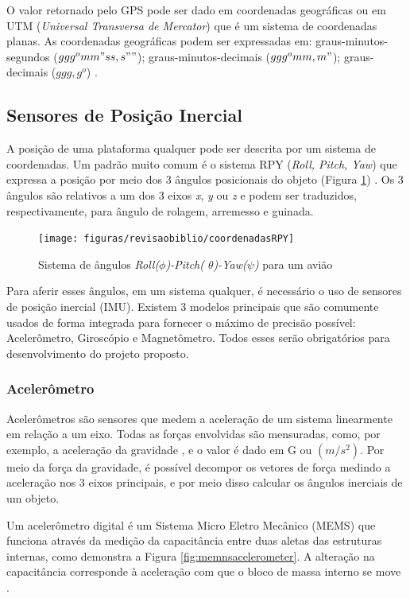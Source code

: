 O valor retornado pelo GPS pode ser dado em coordenadas geográficas ou em UTM (\textit{Universal Transversa de Mercator}) que é um sistema de coordenadas planas. As coordenadas geográficas podem ser expressadas em: graus-minutos-segundos ($ ggg^o mm" ss,s"" $); graus-minutos-decimais ($ ggg^o mm,m" $); graus-decimais ($ ggg,g^o $) \cite{apostilagps}. 


\subsection{Sensores de Posição Inercial}

A posição de uma plataforma qualquer pode ser descrita por um sistema de coordenadas. Um padrão muito comum é o sistema RPY (\textit{Roll, Pitch, Yaw}) que expressa a posição por meio dos 3 ângulos posicionais do objeto (Figura \ref{fig:RPY}) \cite{diss:FabioAUV}. Os 3 ângulos são relativos a um dos 3 eixos \textit{x}, \textit{y} ou \textit{z} e podem ser traduzidos, respectivamente, para ângulo de rolagem, arremesso e guinada.

\begin{figure}[!htb]
	\centering
	\caption{Sistema de ângulos \textit{Roll($\phi $)-Pitch( $ \theta$)-Yaw($ \psi $)} para um avião}
	\texttt{[image: figuras/revisaobiblio/coordenadasRPY]}
	\label{fig:RPY}
\end{figure}

Para aferir esses ângulos, em um sistema qualquer, é necessário o uso de sensores de posição inercial (IMU). Existem 3 modelos principais que são comumente usados de forma integrada para fornecer o máximo de precisão possível: Acelerômetro, Giroscópio e Magnetômetro. Todos esses serão obrigatórios para desenvolvimento do projeto proposto.

\subsubsection{Acelerômetro}

Acelerômetros são sensores que medem a aceleração de um sistema linearmente em relação a um eixo. Todas as forças envolvidas são mensuradas, como, por exemplo, a aceleração da gravidade \cite{diss:FabioAUV}, e o valor é dado em G ou $ (m/s^2) $. Por meio da força da gravidade, é possível decompor os vetores de força medindo a aceleração nos 3 eixos principais, e por meio disso calcular os ângulos inerciais de um objeto.

Um acelerômetro digital é um Sistema Micro Eletro Mecânico (MEMS) que funciona através da medição da capacitância entre duas aletas das estruturas internas, como demonstra a Figura \ref{fig:memnsacelerometer}. A alteração na capacitância corresponde à aceleração com que o bloco de massa interno se move \cite{site:MEMSHOTO}. 



